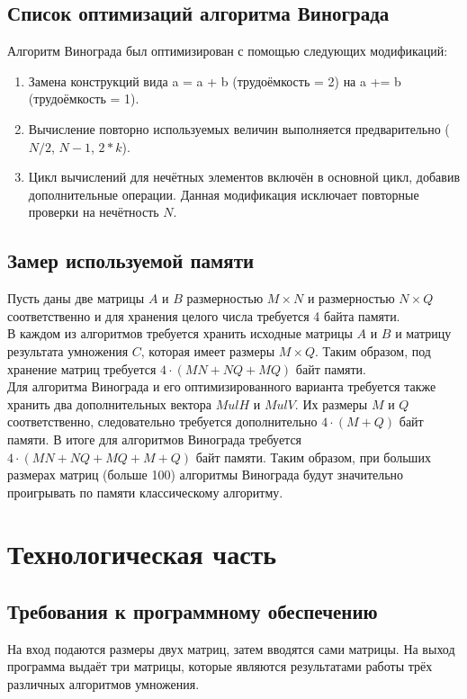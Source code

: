 \documentclass[12pt, a4paper]{report}
\begin{document}
	\section{Список оптимизаций алгоритма Винограда}
	Алгоритм Винограда был оптимизирован с помощью следующих модификаций:
	\begin{enumerate}
		\item Замена конструкций вида a = a + b (трудоёмкость = 2) на a += b (трудоёмкость = 1).
		\item Вычисление повторно используемых величин выполняется предварительно ($N / 2$, $N - 1$, $2 * k$).
		\item Цикл вычислений для нечётных элементов включён в основной цикл, добавив дополнительные операции. Данная модификация исключает повторные проверки на нечётность $N$.
 	\end{enumerate}

	\section{Замер используемой памяти}
	Пусть даны две матрицы $A$ и $B$ размерностью $M\times N$ и размерностью $N \times Q$ соответственно и для хранения целого числа требуется 4 байта памяти.\\
	В каждом из алгоритмов требуется хранить исходные матрицы $A$ и $B$ и матрицу результата умножения $C$, которая имеет размеры $M \times Q$. Таким образом, под хранение матриц требуется $4 \cdot (MN + NQ + MQ)$ байт памяти.\\
	Для алгоритма Винограда и его оптимизированного варианта требуется также хранить два дополнительных вектора $MulH$ и $MulV$. Их размеры $M$ и $Q$ соответственно, следовательно требуется дополнительно $4 \cdot (M + Q)$ байт памяти. В итоге для алгоритмов Винограда требуется $4 \cdot (MN + NQ + MQ + M + Q)$ байт памяти. Таким образом, при больших размерах матриц (больше 100) алгоритмы Винограда будут значительно проигрывать по памяти классическому алгоритму.\\
	
	\chapter{Технологическая часть}
	\section{Требования к программному обеспечению}
	На вход подаются размеры двух матриц, затем вводятся сами матрицы. На выход программа выдаёт три матрицы, которые являются результатами работы трёх различных алгоритмов умножения.
\end{document}
